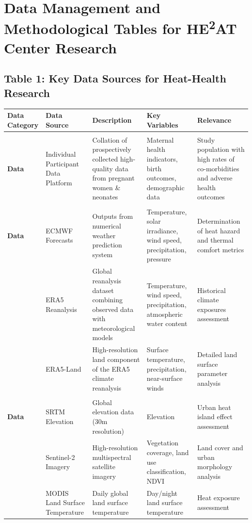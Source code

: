 \documentclass[12pt,a4paper,landscape]{article}
\begin{document}
\section*{Data Management and Methodological Tables for HE\textsuperscript{2}AT Center Research}

\subsection*{Table 1: Key Data Sources for Heat-Health Research}
\begin{longtable}{p{3cm}p{4cm}p{5cm}p{4cm}p{4cm}}
\toprule
\textbf{Data Category} & \textbf{Data Source} & \textbf{Description} & \textbf{Key Variables} & \textbf{Relevance} \\
\midrule
\endhead

\begin{tabular}{c}\textbf{Biomedical}\\\textbf{Data}\end{tabular} 
& Individual Participant Data Platform 
& Collation of prospectively collected high-quality data from pregnant women \& neonates 
& Maternal health indicators, birth outcomes, demographic data 
& Study population with high rates of co-morbidities and adverse health outcomes \\
\midrule

\begin{tabular}{c}\textbf{Climate/Weather}\\\textbf{Data}\end{tabular} 
& ECMWF Forecasts 
& Outputs from numerical weather prediction system 
& Temperature, solar irradiance, wind speed, precipitation, pressure 
& Determination of heat hazard and thermal comfort metrics \\
\cmidrule{2-5}
& ERA5 Reanalysis 
& Global reanalysis dataset combining observed data with meteorological models 
& Temperature, wind speed, precipitation, atmospheric water content 
& Historical climate exposures assessment \\
\cmidrule{2-5}
& ERA5-Land 
& High-resolution land component of the ERA5 climate reanalysis 
& Surface temperature, precipitation, near-surface winds 
& Detailed land surface parameter analysis \\
\midrule

\begin{tabular}{c}\textbf{Remote Sensing}\\\textbf{Data}\end{tabular} 
& SRTM Elevation 
& Global elevation data (30m resolution) 
& Elevation 
& Urban heat island effect assessment \\
\cmidrule{2-5}
& Sentinel-2 Imagery 
& High-resolution multispectral satellite imagery 
& Vegetation coverage, land use classification, NDVI 
& Land cover and urban morphology analysis \\
\cmidrule{2-5}
& MODIS Land Surface Temperature 
& Daily global land surface temperature 
& Day/night land surface temperature 
& Heat exposure assessment \\
\midrule


\end{longtable}
\end{document}
